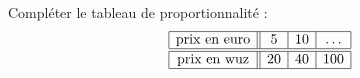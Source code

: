 
    \begin{mental}
        Compléter le tableau de proportionnalité :
        \begin{equation*}
            \begin{array}[]{|c||c|c|c|}
                \hline
                \text{prix en euro}&5&10&\ldots\\
                  \hline\hline
                  \text{prix en wuz}&20&40&100\\ 
                  \hline 
                   \end{array}
               \end{equation*}
    \end{mental}
